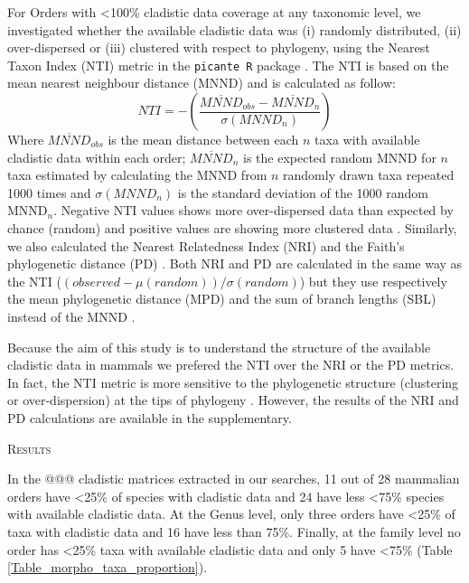 \documentclass[12pt,letterpaper]{article}
\renewcommand{\section}[1]{%
\bigskip
\begin{center}
\begin{Large}
\normalfont\scshape #1
\medskip
\end{Large}
\end{center}}
\begin{document}
For Orders with \textless 100\% cladistic data coverage at any taxonomic level, we investigated whether the available cladistic data was (i) randomly distributed, (ii) over-dispersed or (iii) clustered with respect to phylogeny, using the Nearest Taxon Index (NTI) metric \citep{webb2002phylogenies} in the \texttt{picante R} package \citep{picante,R}.
The NTI is based on the mean nearest neighbour distance (MNND) and is calculated as follow:
\begin{equation}
NTI=-(\frac{\overline{MNND}_{obs}-\overline{MNND}_{n}}{\sigma(MNND_{n})})
\end{equation}
Where $\overline{MNND}_{obs}$ is the mean distance between each $n$ taxa with available cladistic data within each order; $\overline{MNND}_{n}$ is the expected random MNND for $n$ taxa estimated by calculating the MNND from $n$ randomly drawn taxa repeated 1000 times and $\sigma(MNND_{n})$ is the standard deviation of the 1000 random MNND$_{n}$.
Negative NTI values shows more over-dispersed data than expected by chance (random) and positive values are showing more clustered data \citep{webb2002phylogenies}.
Similarly, we also calculated the Nearest Relatedness Index (NRI) \citep{webb2002phylogenies,Cooper2012} and the Faith's phylogenetic distance (PD) \citep{Faith19921}.
Both NRI and PD are calculated in the same way as the NTI (\((observed-\mu(random))/\sigma(random)\)) but they use respectively the mean phylogenetic distance (MPD) and the sum of branch lengths (SBL) instead of the MNND \citep{Faith19921,webb2002phylogenies,Cooper2012}. 

Because the aim of this study is to understand the structure of the available cladistic data in mammals we prefered the NTI over the NRI or the PD metrics.
In fact, the NTI metric is more sensitive to the phylogenetic structure (clustering or over-dispersion) at the tips of phylogeny \citep{Cooper2008}.
However, the results of the NRI and PD calculations are available in the supplementary.

%
%

\section{Results}
In the @@@ cladistic matrices extracted in our searches, 11 out of 28 mammalian orders have \textless 25\% of species with cladistic data and 24 have less \textless 75\% species with available cladistic data.
At the Genus level, only three orders have \textless 25\% of taxa with cladistic data and 16 have less than 75\%.
Finally, at the family level no order has \textless 25\% taxa with available cladistic data and only 5 have \textless 75\% (Table \ref{Table_morpho_taxa_proportion}).
\end{document}
